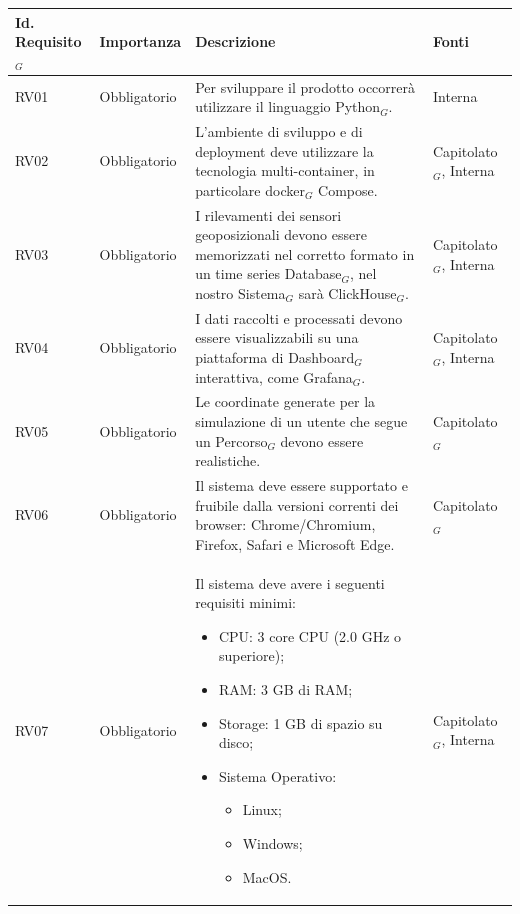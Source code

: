 \documentclass[10pt]{article}
\begin{document}
\begin{justify}
\begin{table}[H]
\centering
\renewcommand{\arraystretch}{1.5}
\begin{tabular}{|>{\centering\arraybackslash}m{2.7cm}|>{\centering\arraybackslash}m{2.7cm}|>{\centering\arraybackslash}m{6cm}|>{\centering\arraybackslash}m{2.1cm}|}
\hline
\textbf{Id. Requisito$_G$} & \textbf{Importanza} & \textbf{Descrizione} & \textbf{Fonti}\\
\hline
RV01 & Obbligatorio &  Per sviluppare il prodotto occorrerà utilizzare il linguaggio Python$_G$. & Interna\\
\hline 
RV02 & Obbligatorio & L'ambiente di sviluppo e di deployment deve utilizzare la tecnologia multi-container, in particolare docker$_G$ Compose. & Capitolato$_G$, Interna\\
\hline
RV03 & Obbligatorio & I rilevamenti dei sensori geoposizionali
devono essere memorizzati nel corretto formato in un time series Database$_G$, nel nostro Sistema$_G$ sarà ClickHouse$_G$. & Capitolato$_G$, Interna \\
\hline
RV04 & Obbligatorio & I dati raccolti e processati devono essere visualizzabili su una piattaforma di Dashboard$_G$ interattiva, come Grafana$_G$. & Capitolato$_G$, Interna\\
\hline
RV05 & Obbligatorio & Le coordinate generate per la simulazione di un utente che segue un Percorso$_G$ devono essere realistiche. & Capitolato$_G$\\
\hline
RV06 & Obbligatorio & Il sistema deve essere supportato e fruibile dalla versioni correnti dei browser: Chrome/Chromium, Firefox, Safari e Microsoft Edge. & Capitolato$_G$\\
\hline 
RV07 & Obbligatorio & Il sistema deve avere i seguenti requisiti minimi:
\begin{itemize}
    \item CPU: 3 core CPU (2.0 GHz o superiore);
    \item RAM: 3 GB di RAM;
    \item Storage: 1 GB di spazio su disco;
    \item Sistema Operativo:
    \begin{itemize}
        \item Linux;
        \item Windows;
        \item MacOS.
    \end{itemize}
\end{itemize} & Capitolato$_G$, Interna\\
\hline 
\end{tabular}


\end{table}
\end{justify}
\end{document}
